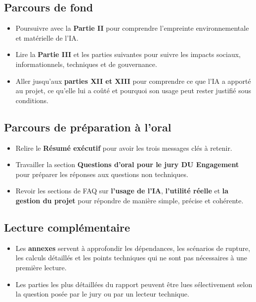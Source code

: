 \documentclass[
  10pt,
  a4paper,
  DIV=11,
  numbers=noendperiod,
  oneside]{scrreprt}
\providecommand{\tightlist}{%
  \setlength{\itemsep}{0pt}\setlength{\parskip}{0pt}}
\let\oldtextbf\textbf
\renewcommand{\textbf}[1]{\oldtextbf{\textcolor{cmmnavy}{#1}}}
\begin{document}
\subsection{Parcours de fond}\label{parcours-de-fond}

\begin{itemize}
\tightlist
\item
  Poursuivre avec la \textbf{Partie II} pour comprendre l'empreinte
  environnementale et matérielle de l'IA.
\item
  Lire la \textbf{Partie III} et les parties suivantes pour suivre les
  impacts sociaux, informationnels, techniques et de gouvernance.
\item
  Aller jusqu'aux \textbf{parties XII et XIII} pour comprendre ce que
  l'IA a apporté au projet, ce qu'elle lui a coûté et pourquoi son usage
  peut rester justifié sous conditions.
\end{itemize}

\subsection{Parcours de préparation à
l'oral}\label{parcours-de-pruxe9paration-uxe0-loral}

\begin{itemize}
\tightlist
\item
  Relire le \textbf{Résumé exécutif} pour avoir les trois messages clés
  à retenir.
\item
  Travailler la section \textbf{Questions d'oral pour le jury DU
  Engagement} pour préparer les réponses aux questions non techniques.
\item
  Revoir les sections de FAQ sur \textbf{l'usage de l'IA},
  \textbf{l'utilité réelle} et \textbf{la gestion du projet} pour
  répondre de manière simple, précise et cohérente.
\end{itemize}

\subsection{Lecture complémentaire}\label{lecture-compluxe9mentaire}

\begin{itemize}
\tightlist
\item
  Les \textbf{annexes} servent à approfondir les dépendances, les
  scénarios de rupture, les calculs détaillés et les points techniques
  qui ne sont pas nécessaires à une première lecture.
\item
  Les parties les plus détaillées du rapport peuvent être lues
  sélectivement selon la question posée par le jury ou par un lecteur
  technique.
\end{itemize}
\end{document}

